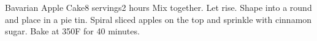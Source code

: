 \documentclass[../Cookbook.tex]{subfiles}
\begin{document}
\begin{recipe}[BavarianAppleCake]{Bavarian Apple Cake}{8 servings}{2 hours}
Mix together. Let rise. Shape into a round and place in a pie tin. Spiral sliced apples on the top and sprinkle with cinnamon sugar. Bake at 350\0F for 40 minutes.
\end{recipe}
\end{document}
